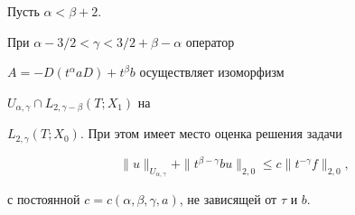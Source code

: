 \begin{thms}\label{a-b}


Пусть $\alpha < \beta+2$.


При $\alpha-3/2 < \gamma < 3/2+\beta-\alpha$ оператор


$A=-D(t^\alpha a D) + t^\beta b$ осуществляет изоморфизм


$U_{\alpha,\gamma} \cap L_{2,\gamma-\beta}(T;X_1)$ на


$L_{2,\gamma}(T;X_0)$. При этом имеет место оценка решения задачи


\begin{equation} \label{uneq-b}


\|u\|_{U_{\alpha,\gamma}}+\|t^{\beta-\gamma}b u\|_{2,0} \le


c \|t^{-\gamma}f\|_{2,0},


\end{equation}


с постоянной $c=c(\alpha,\beta,\gamma,a)$, не зависящей от $\tau$ и $b$.


\end{thms}






